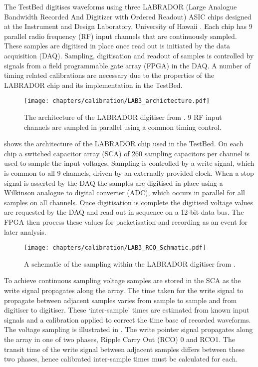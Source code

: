 The TestBed digitises waveforms using three LABRADOR (Large Analogue Bandwidth Recorded And Digitizer with Ordered Readout) ASIC chips designed at the Instrument and Design Laboratory, University of Hawaii \cite{Varner2007447}. Each chip has 9 parallel radio frequency (RF) input channels that are continuously sampled. These samples are digitised in place once read out is initiated by the data acquisition (DAQ). Sampling, digitisation and readout of samples is controlled by signals from a field programmable gate array (FPGA) in the DAQ. A number of timing related calibrations are necessary due to the properties of the LABRADOR chip and its implementation in the TestBed. 

\begin{figure}[htpb]
  \texttt{[image: chapters/calibration/LAB3\_archictecture.pdf]}
  \caption{The architecture of the LABRADOR digitiser from \cite{Varner2007447}. 9 RF input channels are sampled in parallel using a common timing control.}
  \label{fig:calibration:LABRADOR-Digitiser-Chip:Architecture}
\end{figure}

 shows the architecture of the LABRADOR chip used in the TestBed. On each chip a switched capacitor array (SCA) of 260 sampling capacitors per channel is used to sample the input voltages. Sampling is controlled by a write signal, which is common to all 9 channels, driven by an externally provided clock. When a stop signal is asserted by the DAQ the samples are digitised in place using a Wilkinson analogue to digital converter (ADC), which occurs in parallel for all samples on all channels. Once digitisation is complete the digitised voltage values are requested by the DAQ and read out in sequence on a 12-bit data bus. The FPGA then process these values for packetisation and recording as an event for later analysis.

\begin{figure}[htpb]
  \texttt{[image: chapters/calibration/LAB3\_RCO\_Schmatic.pdf]}
  \caption{A schematic of the sampling within the LABRADOR digitiser from \cite{Varner2007447}.}
  \label{fig:calibration:LABRADOR-Digitiser-Chip:Schematic}
\end{figure}


To achieve continuous sampling voltage samples are stored in the SCA as the write signal propagates along the array. The time taken for the write signal to propagate between adjacent samples varies from sample to sample and from digitiser to digitiser. These `inter-sample' times are estimated from known input signals and a calibration applied to correct the time base of recorded waveforms. The voltage sampling is illustrated in . The write pointer signal propagates along the array in one of two phases, Ripple Carry Out (RCO) 0 and RCO1. The transit time of the write signal between adjacent samples differs between these two phases, hence calibrated inter-sample times must be calculated for each.

